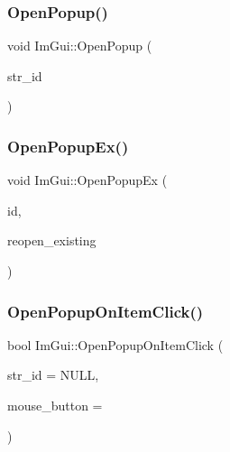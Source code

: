 \mbox{\label{namespace_im_gui_a9576648c40b92f54b671e2e51654dd2c}} 
\subsubsection{\texorpdfstring{Open\+Popup()}{OpenPopup()}}
{\footnotesize\ttfamily void Im\+Gui\+::\+Open\+Popup (\begin{DoxyParamCaption}\item[{const char $\ast$}]{str\+\_\+id }\end{DoxyParamCaption})}

\mbox{\label{namespace_im_gui_a92683a696319581577334d6b798e2f97}} 
\subsubsection{\texorpdfstring{Open\+Popup\+Ex()}{OpenPopupEx()}}
{\footnotesize\ttfamily void Im\+Gui\+::\+Open\+Popup\+Ex (\begin{DoxyParamCaption}\item[{\mbox{\hyperlink{imgui_8h_a1785c9b6f4e16406764a85f32582236f}{Im\+Gui\+ID}}}]{id,  }\item[{bool}]{reopen\+\_\+existing }\end{DoxyParamCaption})}

\mbox{\label{namespace_im_gui_a546fc46d8f510cb17a2f272891e2f5b3}} 
\subsubsection{\texorpdfstring{Open\+Popup\+On\+Item\+Click()}{OpenPopupOnItemClick()}}
{\footnotesize\ttfamily bool Im\+Gui\+::\+Open\+Popup\+On\+Item\+Click (\begin{DoxyParamCaption}\item[{const char $\ast$}]{str\+\_\+id = {\ttfamily NULL},  }\item[{int}]{mouse\+\_\+button = {} }\end{DoxyParamCaption})}

